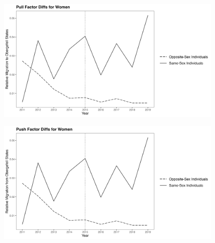 \documentclass[12pt,letterpaper]{article}
\begin{document}

\begin{figure}[htbp]
    \centering
    \includegraphics[width=1\linewidth]{outputs/summary_stats/women_post_diffs.png}
    \caption{}
    \label{fig: women_post_diffs}
\end{figure}
\begin{figure}[htbp]
    \centering
    \includegraphics[width=1\linewidth]{outputs/summary_stats/women_ante_diffs.png}
    \caption{}
    \label{fig: women_ante_diffs}
\end{figure}
\end{document}
